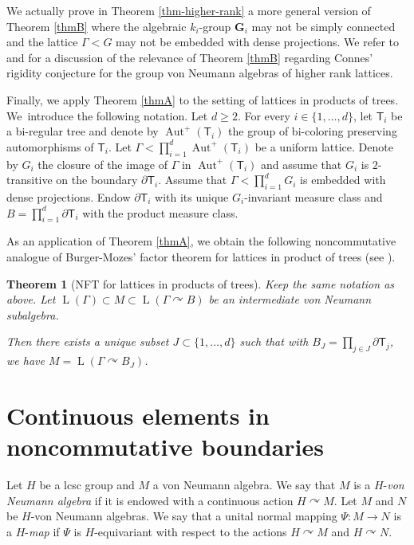 \documentclass[JEP,XML,SOM,Unicode,published]{cedram}
\newcommand{\bG}{\boldsymbol{G}}
\newtheorem{letterthm}{Theorem}
\theoremstyle{definition}
\DeclareMathOperator{\Aut}{Aut}
\DeclareMathOperator{\rL}{L}
\begin{document}
We actually prove in Theorem \ref{thm-higher-rank} a more general version of Theorem \ref{thmB} where the algebraic $k_i$-group $\bG_i$ may not be simply connected and the lattice $\Gamma < G$ may not be embedded with dense projections. We refer to \cite[\S 6]{BBH21} and \cite[\S 5]{Ho21} for a discussion of the relevance of Theorem \ref{thmB} regarding Connes'\! rigidity conjecture for the group von Neumann algebras of higher rank lattices.

Finally, we apply Theorem \ref{thmA} to the setting of lattices in products of trees. We~introduce the following notation. Let $d\geq 2$. For every $i \in \{1, \dots, d\}$, let $\mathsf T_i$ be a bi-regular tree and denote by $\Aut^+(\mathsf T_i)$ the group of bi-coloring preserving automorphisms of $\mathsf T_i$. Let $\Gamma < \prod_{i = 1}^d \Aut^+(\mathsf T_i)$ be a uniform lattice. Denote by $G_i$ the closure of the image of $\Gamma$ in $\Aut^+(\mathsf T_i)$ and assume that $G_i$ is $2$-transitive on the boundary $\partial \mathsf T_i$. Assume that $\Gamma < \prod_{i = 1}^d G_i$ is embedded with dense projections. Endow $\partial \mathsf T_i$ with its unique $G_i$-invariant measure class and $B = \prod_{i = 1}^d \partial \mathsf T_i$ with the product measure class.

As an application of Theorem \ref{thmA}, we obtain the following noncommutative analogue of Burger-Mozes'\! factor theorem for lattices in product of trees (see \cite[Th.\,4.6]{BM00b}).

\begin{letterthm}[NFT for lattices in products of trees]\label{thmC}
Keep the same notation as above. Let $\rL(\Gamma) \subset M \subset \rL(\Gamma \curvearrowright B)$ be an intermediate von Neumann subalgebra.

Then there exists a unique subset $J \subset \{1, \dots, d\}$ such that with $B_J = \prod_{j \in J} \partial \mathsf T_j$, we have $M = \rL(\Gamma \curvearrowright B_J)$.
\end{letterthm}

\section{Continuous elements in noncommutative boundaries}

Let $H$ be a lcsc group and $M$ a von Neumann algebra. We say that $M$ is a $H$-\emph{von Neumann algebra} if it is endowed with a continuous action $H \curvearrowright M$. Let $M$ and $N$ be $H$-von Neumann algebras. We say that a unital normal mapping $\Psi : M \to N$ is a $H$-\emph{map} if $\Psi$ is $H$-equivariant with respect to the actions $H \curvearrowright M$ and $H \curvearrowright N$.
\end{document}
